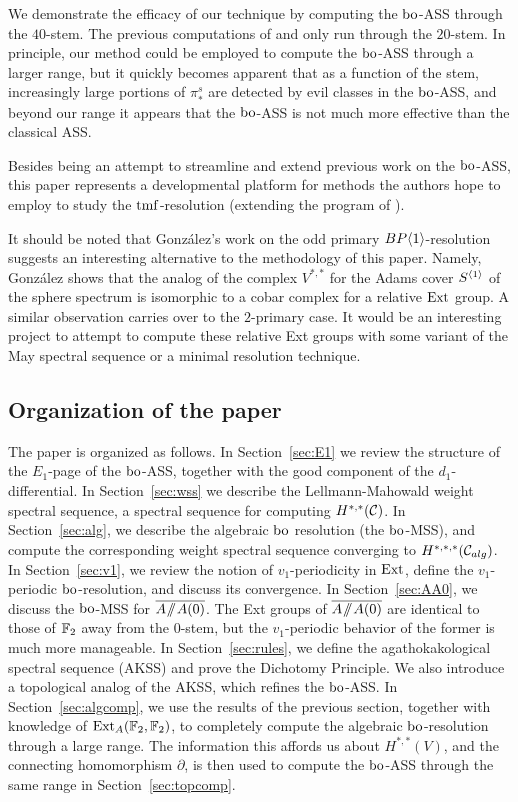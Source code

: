 We demonstrate the efficacy of our technique by computing the $\mathrm{bo}$-ASS through the $40$-stem.  The previous computations of \cite{LM} and \cite{Davisbo} only run through the $20$-stem.  In principle, our method could be employed to compute the $\mathrm{bo}$-ASS through a larger range, but it quickly becomes apparent that as a function of the stem,  increasingly large portions of $\pi_*^s$ are detected by evil classes in the $\mathrm{bo}$-ASS, and beyond our range it appears that the $\mathrm{bo}$-ASS is not much more effective than the classical ASS.


Besides being an attempt to streamline and extend previous work on the $\mathrm{bo}$-ASS, this paper represents a developmental platform for methods the authors hope to employ to study the $\mathrm{tmf}$-resolution (extending the program of \cite{BOSS}).

It should be noted that Gonz\'alez's work on the odd primary $BP\langle 1 \rangle$-resolution \cite{Gonzalez2} suggests an interesting alternative to the methodology of this paper. Namely, Gonz\'alez shows that the analog of the complex $V^{*,*}$ for the Adams cover $S^{\langle 1 \rangle}$ of the sphere  spectrum is isomorphic to a cobar complex for a relative $\operatorname{Ext}$ group. A similar observation carries over to the $2$-primary case.  It would be an interesting project to attempt to compute these relative Ext groups with some variant of the May spectral sequence or a minimal resolution technique.


\subsection*{Organization of the paper}

The paper is organized as follows. In Section~\ref{sec:E1} we review the structure of the $E_1$-page of the $\mathrm{bo}$-ASS,
together with the good component of the $d_1$-differential. In Section~\ref{sec:wss} we describe the Lellmann-Mahowald
weight spectral sequence, a spectral sequence for computing $H^{*,*}(\mathcal{C})$.  In Section~\ref{sec:alg}, we describe the algebraic $\mathrm{bo}$ resolution (the $\mathrm{bo}$-MSS), and compute the corresponding weight spectral sequence converging to $H^{*,*,*}(\mathcal{C}_{alg})$. 
In Section~\ref{sec:v1}, we review the notion of $v_1$-periodicity in $\operatorname{Ext}$, define the $v_1$-periodic $\mathrm{bo}$-resolution, and discuss its convergence.  
In Section~\ref{sec:AA0}, we discuss the $\mathrm{bo}$-MSS for $\overline{A \! \sslash \! A(0)}$.  The Ext groups of $\overline{A \! \sslash \! A(0)}$ are identical to those of $\mathbb{F}_2$ away from the $0$-stem, but the $v_1$-periodic behavior of the former is much more manageable.
In Section~\ref{sec:rules}, we define the agathokakological spectral sequence (AKSS) and prove the Dichotomy Principle.  We also introduce a topological analog of the AKSS, which refines the $\mathrm{bo}$-ASS.  In Section~\ref{sec:algcomp}, we use the results of the previous section, together with knowledge of $\operatorname{Ext}_A(\mathbb{F}_2, \mathbb{F}_2)$, to completely compute the algebraic $\mathrm{bo}$-resolution through a large range.  The information this affords us about $H^{*,*}(V)$, and the connecting homomorphism $\partial$, is then used to compute the $\mathrm{bo}$-ASS through the same range in Section~\ref{sec:topcomp}.  



